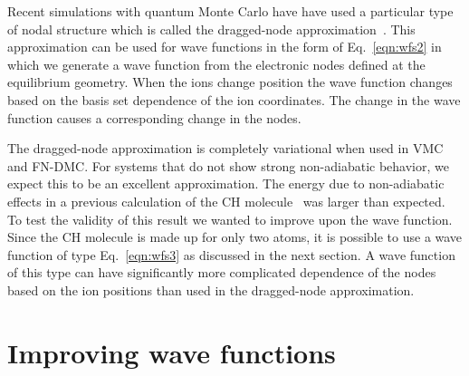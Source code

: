 \documentclass[aip,jcp,numerical,reprint]{revtex4-1}
\begin{document}
Recent simulations with quantum Monte Carlo have have used a particular type of nodal structure which is called the  dragged-node approximation~\cite{Tubman_ECG,Yang2015}.
This approximation can be used for wave functions in the form of Eq.~\eqref{eqn:wfs2} in which  we generate a wave function from the electronic nodes defined at the equilibrium geometry.   When the ions change position the wave function changes based on the basis set dependence of the ion coordinates. The change in the wave function causes a corresponding change in the nodes.  

 The dragged-node approximation is completely variational when used in VMC and FN-DMC.  
For systems that do not show strong non-adiabatic behavior, we expect this to be an excellent approximation. %
  The energy due to non-adiabatic effects in a previous calculation of the CH molecule~\cite{Yang2015} was larger than expected.   To test the validity of this result we wanted to improve upon the wave function.    Since the CH molecule is made up for only two atoms, it is possible to use a wave function of type Eq.~\eqref{eqn:wfs3} as discussed in the next section.   A wave function of this type can have significantly more complicated dependence of the nodes based on the ion positions than used in the dragged-node approximation.

\section{Improving wave functions}
\end{document}
